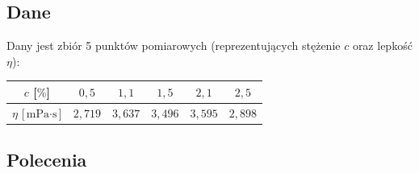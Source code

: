 \documentclass[a4paper,11pt]{article}
\begin{document}
\subsection*{Dane}

Dany jest zbiór 5 punktów pomiarowych (reprezentujących stężenie $c$ oraz lepkość $\eta$):

\begin{center}
\begin{tabular}{c|ccccc}
  \toprule
  $c$ [$\%$] & $0{,}5$ & $1{,}1$ & $1{,}5$ & $2{,}1$ & $2{,}5$ \\
  \midrule
  $\eta$ [$\text{mPa}\cdot\text{s}$] & $2{,}719$ & $3{,}637$ & $3{,}496$ & $3{,}595$ & $2{,}898$ \\
  \bottomrule
\end{tabular}
\end{center}

\subsection*{Polecenia}
\end{document}
